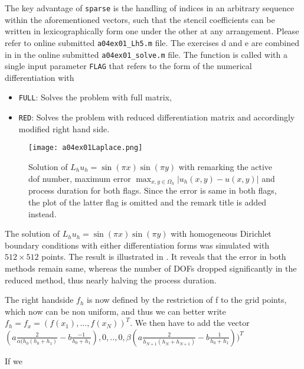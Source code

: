 The key advantage of \texttt{sparse} is the handling of indices in an arbitrary sequence within the aforementioned vectors, such that the stencil coefficients can be written in lexicographically form one under the other at any arrangement.
%
Please refer to online submitted \texttt{a04ex01\_Lh5.m} file.
%
The exercises d and e are combined in in the online submitted \texttt{a04ex01\_solve.m} file.
The function is called with a single input parameter \texttt{FLAG} that refers to the form of the numerical differentiation with
\begin{itemize}
	\item \texttt{FULL}: Solves the problem with full matrix,
	\item \texttt{RED}: Solves the problem with reduced differentiation matrix and accordingly modified right hand side.
\end{itemize}
\begin{figure}[H]
	\texttt{[image: a04ex01Laplace.png]} 
	\caption{Solution of $L_h u_h = \sin{(\pi x)} \sin{(\pi y)}$ with remarking the active dof number, maximum error $\max_{x,y \in \Omega_h} |u_h (x,y) - u(x,y)|$ and process duration for both flags. Since the error is same in both flags, the plot of the latter flag is omitted and the remark title is added instead.}
	\label{fig:a04ex01Laplace}
\end{figure}

The solution of $L_h u_h = \sin{(\pi x)} \sin{(\pi y)} $ with homogeneous Dirichlet boundary conditions with either differentiation forms was simulated with $512 \times 512$ points.
The result is illustrated in .
It reveals that the error in both methods remain same, whereas the number of DOFs dropped significantly in the reduced method, thus nearly halving the process duration.
%
%

The right handside $f_h$ is now defined by the restriction of f to the grid points, which now can be  non uniform, and thus we can better write $f_h=f_{x}=(f(x_1),...,f(x_N))^T$. We then have to add the vector $(a\frac{2}{\alpha(h_0(h_0+h_{1})}-b\frac{-1}{h_0+h_1}),0,..,0,\beta(a\frac{2}{h_{N+1}(h_N+h_{N+1})}-b\frac{1}{h_0+h_1}))^T$

If we 

%
%

%

%

%
